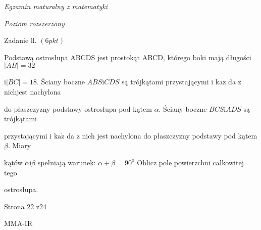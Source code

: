 \documentclass[a4paper,12pt]{article}
\begin{document}
{\it Egzamin maturalny z matematyki}

{\it Poziom rozszerzony}

Zadanie ll. $(6pkt)$

Podstawą ostrosłupa ABCDS jest prostokąt ABCD, którego boki mają długości $|AB|=32$

$\mathrm{i}|BC|=18$. Ściany boczne $ABS\mathrm{i}CDS$ są trójkątami przystającymi i $\mathrm{k}\mathrm{a}\dot{\mathrm{z}}$ da z nichjest nachylona

do płaszczyzny podstawy ostrosłupa pod kątem $\alpha$. Ściany boczne $BCS\mathrm{i}ADS$ są trójkątami

przystającymi i $\mathrm{k}\mathrm{a}\dot{\mathrm{z}}$ da z nich jest nachylona do płaszczyzny podstawy pod kątem $\beta$. Miary

kątów $\alpha \mathrm{i} \beta$ spełniają warunek: $\alpha+\beta=90^{\mathrm{o}}$ Oblicz pole powierzchni całkowitej tego

ostrosłupa.

Strona 22 z24

MMA-IR
\end{document}
